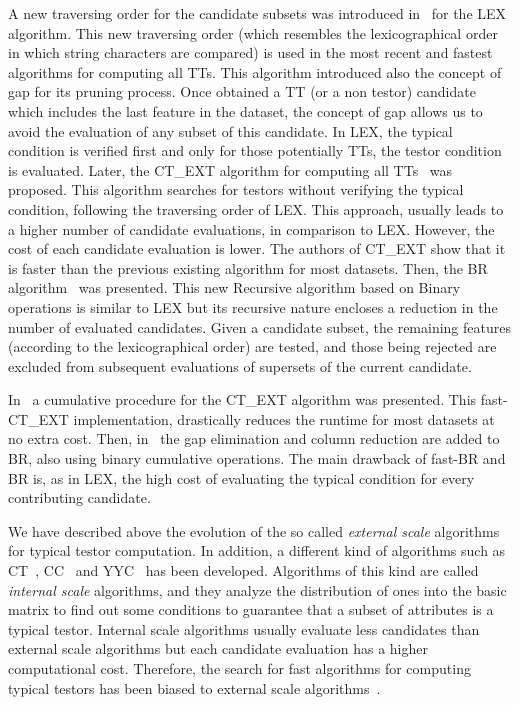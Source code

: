 \documentclass[citenumber]{llncs}
\begin{document}
	A new traversing order for the candidate subsets was introduced in~\cite{Santiesteban2003} for the LEX algorithm. This new traversing order (which resembles the lexicographical order in which string characters are compared) is used in the most recent and fastest algorithms for computing all TTs. This algorithm introduced also the concept of gap for its pruning process. Once obtained a TT (or a non testor) candidate which includes the last feature in the dataset, the concept of gap allows us to avoid the evaluation of any subset of this candidate. In LEX, the typical condition is verified first and only for those potentially TTs, the testor condition is evaluated. Later, the CT\_EXT algorithm for computing all TTs~\cite{Sanchez2007} was proposed. This algorithm searches for testors without verifying the typical condition, following the traversing order of LEX. This approach, usually leads to a higher number of candidate evaluations, in comparison to LEX. However, the cost of each candidate evaluation is lower. The authors of CT\_EXT show that it is faster than the previous existing algorithm for most datasets. Then, the BR algorithm~\cite{Lias2009} was presented. This new Recursive algorithm based on Binary operations is similar to LEX but its recursive nature encloses a reduction in the number of evaluated candidates. Given a candidate subset, the remaining features (according to the lexicographical order) are tested, and those being rejected are excluded from subsequent evaluations of supersets of the current candidate.
	
	In~\cite{Sanchez2010} a cumulative procedure for the CT\_EXT algorithm was presented. This fast-CT\_EXT implementation, drastically reduces the runtime for most datasets at no extra cost. Then, in~\cite{Lias2013} the gap elimination and column reduction are added to BR, also using binary cumulative operations. The main drawback of fast-BR and BR is, as in LEX, the high cost of evaluating the typical condition for every contributing candidate. 
	
	We have described above the evolution of the so called \emph{external scale} algorithms for typical testor computation. In addition, a different kind of algorithms such as CT~\cite{Bravo83}, CC~\cite{Aguila84} and YYC~\cite{Alba14} has been developed. Algorithms of this kind are called \emph{internal scale} algorithms, and they analyze the distribution of ones into the basic matrix to find out some conditions to guarantee that a subset of attributes is a typical testor. Internal scale algorithms usually evaluate less candidates than external scale algorithms but each candidate evaluation has a higher computational cost. Therefore, the search for fast algorithms for computing typical testors has been biased to external scale algorithms~\cite{Alba14}.
	
\end{document}

